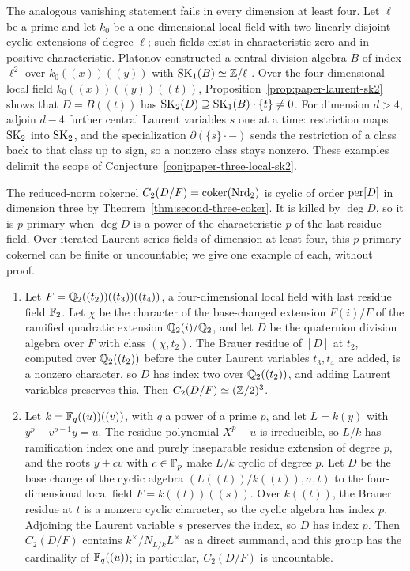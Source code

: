 \begin{remark}\label{rem:paper-sk2-dimension-four}
The analogous vanishing statement fails in every dimension at least four.
Let $\ell$ be a prime and let $k_0$ be a one-dimensional local field with two linearly disjoint cyclic extensions of degree $\ell$; such fields exist in characteristic zero and in positive characteristic.
Platonov constructed a central division algebra $B$ of index $\ell^2$ over $k_0((x))((y))$ with $\operatorname{SK}_1(B)\simeq\mathbb Z/\ell$ \cite[Theorems 4.7 and 5.9]{Platonov1976}.
Over the four-dimensional local field $k_0((x))((y))((t))$, Proposition~\ref{prop:paper-laurent-sk2} shows that $D=B((t))$ has $\operatorname{SK}_2(D)\supseteq\operatorname{SK}_1(B)\cdot\{t\}\ne0$.
For dimension $d>4$, adjoin $d-4$ further central Laurent variables $s$ one at a time: restriction maps $\operatorname{SK}_2$ into $\operatorname{SK}_2$, and the specialization $\partial(\{s\}\cdot-)$ sends the restriction of a class back to that class up to sign, so a nonzero class stays nonzero.
These examples delimit the scope of Conjecture~\ref{conj:paper-three-local-sk2}.
\end{remark}

\begin{remark}\label{rem:paper-wild-cokernel}
The reduced-norm cokernel $C_2(D/F)=\operatorname{coker}(\operatorname{Nrd}_2)$ is cyclic of order $\operatorname{per}[D]$ in dimension three by Theorem~\ref{thm:second-three-coker}.
It is killed by $\deg D$, so it is $p$-primary when $\deg D$ is a power of the characteristic $p$ of the last residue field.
Over iterated Laurent series fields of dimension at least four, this $p$-primary cokernel can be finite or uncountable; we give one example of each, without proof.
\begin{enumerate}
\item Let $F=\mathbb Q_2((t_2))((t_3))((t_4))$, a four-dimensional local field with last residue field $\mathbb F_2$.
Let $\chi$ be the character of the base-changed extension $F(i)/F$ of the ramified quadratic extension $\mathbb Q_2(i)/\mathbb Q_2$, and let $D$ be the quaternion division algebra over $F$ with class $(\chi,t_2)$.
The Brauer residue of $[D]$ at $t_2$, computed over $\mathbb Q_2((t_2))$ before the outer Laurent variables $t_3,t_4$ are added, is a nonzero character, so $D$ has index two over $\mathbb Q_2((t_2))$, and adding Laurent variables preserves this.
Then $C_2(D/F)\simeq(\mathbb Z/2)^3$.
\item Let $k=\mathbb F_q((u))((v))$, with $q$ a power of a prime $p$, and let $L=k(y)$ with $y^p-v^{p-1}y=u$.
The residue polynomial $X^p-u$ is irreducible, so $L/k$ has ramification index one and purely inseparable residue extension of degree $p$, and the roots $y+cv$ with $c\in\mathbb F_p$ make $L/k$ cyclic of degree $p$.
Let $D$ be the base change of the cyclic algebra $(L((t))/k((t)),\sigma,t)$ to the four-dimensional local field $F=k((t))((s))$.
Over $k((t))$, the Brauer residue at $t$ is a nonzero cyclic character, so the cyclic algebra has index $p$.
Adjoining the Laurent variable $s$ preserves the index, so $D$ has index $p$.
Then $C_2(D/F)$ contains $k^\times/N_{L/k}L^\times$ as a direct summand, and this group has the cardinality of $\mathbb F_q((u))$; in particular, $C_2(D/F)$ is uncountable.
\end{enumerate}
\end{remark}

